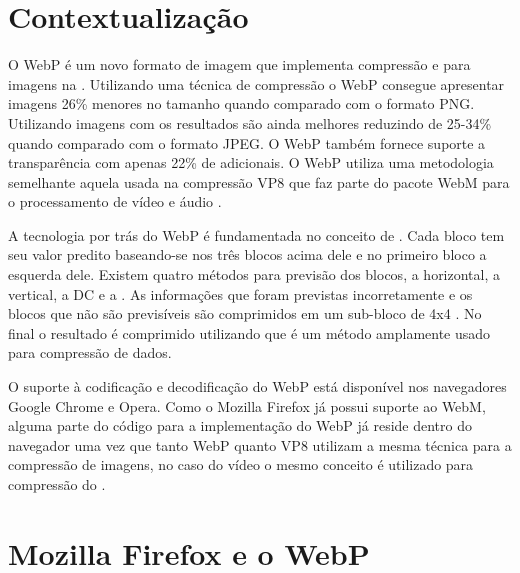 \documentclass[espaco=simples,appendix=Name]{abnt}
\begin{document}
\begin{description}

\section{Contextualização}

\item \noindent
O WebP é um novo formato de imagem que implementa compressão  e  para imagens na . Utilizando uma técnica de compressão  o WebP consegue apresentar imagens 26\% menores no tamanho quando comparado com o formato PNG. Utilizando imagens com  os resultados são ainda melhores reduzindo de 25-34\% quando comparado com o formato JPEG. O WebP também fornece suporte a transparência com apenas 22\% de  adicionais. O WebP utiliza uma metodologia semelhante aquela usada na compressão VP8 que faz parte do pacote WebM para o processamento de vídeo e áudio \cite{WebPLossyStudy}.

A tecnologia por trás do WebP é fundamentada no conceito de . Cada bloco tem seu valor predito baseando-se nos três blocos acima dele e no primeiro bloco a esquerda dele. Existem quatro métodos para previsão dos blocos, a horizontal, a vertical, a DC e a . As informações que foram previstas incorretamente e os blocos que não são previsíveis são comprimidos em um sub-bloco de 4x4 . No final o resultado é comprimido utilizando  que é um método  amplamente usado para compressão de dados.

O suporte à codificação e decodificação do WebP está disponível nos navegadores Google Chrome e Opera. Como o Mozilla Firefox já possui suporte ao WebM, alguma parte do código para a implementação do WebP já reside dentro do navegador uma vez que tanto WebP quanto VP8 utilizam a mesma técnica para a compressão de imagens, no caso do vídeo o mesmo conceito é utilizado para compressão do .

\section{Mozilla Firefox e o WebP}

\item \noindent


\end{description}
\end{document}
